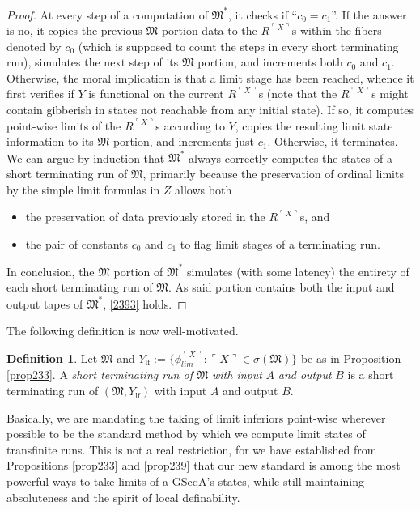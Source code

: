 \documentclass[12pt, twoside]{memoir}
\numberwithin{equation}{section}
\theoremstyle{definition}
\newtheorem{defi}[thm]{Definition}
\theoremstyle{remark}
\theoremstyle{definition}
\theoremstyle{definition}
\theoremstyle{definition}
\theoremstyle{remark}
\begin{document}
\begin{proof}
At every step of a computation of $\mathfrak{M}^*$, it checks if ``$c_0 = c_1$''. If the answer is no, it copies the previous $\mathfrak{M}$ portion data to the $R^{\ulcorner X \urcorner}$s within the fibers denoted by $c_0$ (which is supposed to count the steps in every short terminating run), simulates the next step of its $\mathfrak{M}$ portion, and increments both $c_0$ and $c_1$. Otherwise, the moral implication is that a limit stage has been reached, whence it first verifies if $Y$ is functional on the current $R^{\ulcorner X \urcorner}$s (note that the $R^{\ulcorner X \urcorner}$s might contain gibberish in states not reachable from any initial state). If so, it computes point-wise limits of the $R^{\ulcorner X \urcorner}$s according to $Y$, copies the resulting limit state information to its $\mathfrak{M}$ portion, and increments just $c_1$. Otherwise, it terminates. We can argue by induction that $\mathfrak{M}^*$ always correctly computes the states of a short terminating run of $\mathfrak{M}$, primarily because the preservation of ordinal limits by the simple limit formulas in $Z$ allows both
\begin{itemize}
    \item the preservation of data previously stored in the $R^{\ulcorner X \urcorner}$s, and
    \item the pair of constants $c_0$ and $c_1$ to flag limit stages of a terminating run.
\end{itemize} 

In conclusion, the $\mathfrak{M}$ portion of $\mathfrak{M}^*$ simulates (with some latency) the entirety of each short terminating run of $\mathfrak{M}$. As said portion contains both the input and output tapes of $\mathfrak{M}^*$, \ref{2393} holds.
\end{proof}

The following definition is now well-motivated.

\begin{defi}
Let $\mathfrak{M}$ and $Y_{\mathrm{lf}} := \{\phi_{lim}^{\ulcorner X \urcorner} : \ulcorner X \urcorner \in \sigma(\mathfrak{M})\}$ be as in Proposition \ref{prop233}. A \emph{short terminating run of} $\mathfrak{M}$ \emph{with input} $A$ \emph{and output} $B$ is a short terminating run of $(\mathfrak{M}, Y_{\mathrm{lf}})$ with input $A$ and output $B$.
\end{defi}

Basically, we are mandating the taking of limit inferiors point-wise wherever possible to be the standard method by which we compute limit states of transfinite runs. This is not a real restriction, for we have established from Propositions \ref{prop233} and \ref{prop239} that our new standard is among the most powerful ways to take limits of a GSeqA's states, while still maintaining absoluteness and the spirit of local definability.
\end{document}

